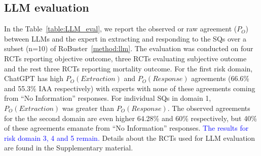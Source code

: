 \documentclass[sn-mathphys,Numbered]{sn-jnl}%
\theoremstyle{thmstyleone}%
\theoremstyle{thmstyletwo}%
\theoremstyle{thmstylethree}%
\begin{document}
%
%
%
\subsection{LLM evaluation}
%
In the Table~\ref{table:LLM_eval}, we report the observed or raw agreement ($P_{O}$) between LLMs and the expert in extracting and responding to the SQs over a subset (n=10) of RoBuster~\ref{method:llm}.
The evaluation was conducted on four RCTs reporting objective outcome, three RCTs evaluating subjective outcome and the rest three RCTs reporting mortality outcome.
For the first risk domain, ChatGPT has high $P_{O} (Extraction)$ and $P_{O} (Response)$ agreements (66.6\% and 55.3\% IAA respectively) with experts with none of these agreements coming from ``No Information'' responses. %
For individual SQs in domain 1, $P_{O} (Extraction)$ was greater than $P_{O} (Response)$.
The observed agreements for the the second domain are even higher 64.28\% and 60\% respectively, but 40\% of these agreements emanate from ``No Information'' responses. %
\textcolor{blue}{The results for risk domain 3, 4 and 5 remain.}
Details about the RCTs used for LLM evaluation are found in the Supplementary material.
%
%
%
\end{document}
